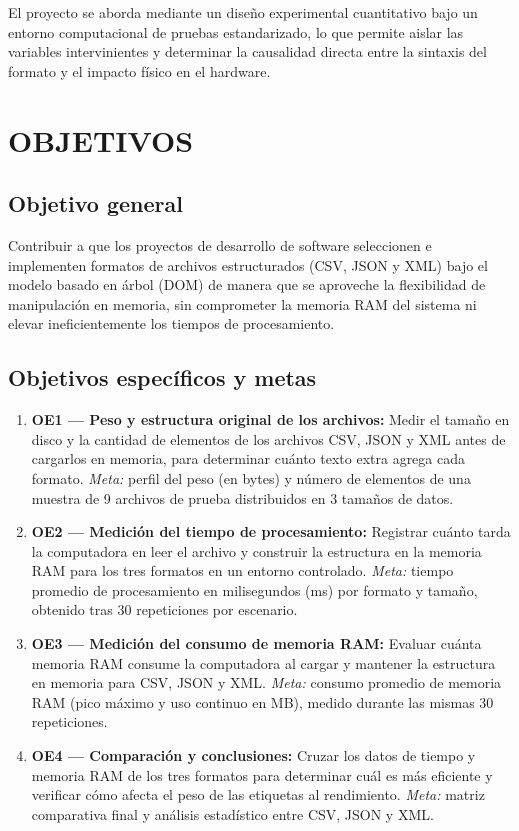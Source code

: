 El proyecto se aborda mediante un diseño experimental cuantitativo bajo un entorno computacional de pruebas estandarizado, lo que permite aislar las variables intervinientes y determinar la causalidad directa entre la sintaxis del formato y el impacto físico en el hardware.

\section{OBJETIVOS}

\subsection{Objetivo general}

Contribuir a que los proyectos de desarrollo de software seleccionen e implementen formatos de archivos estructurados (CSV, JSON y XML) bajo el modelo basado en árbol (DOM) de manera que se aproveche la flexibilidad de manipulación en memoria, sin comprometer la memoria RAM del sistema ni elevar ineficientemente los tiempos de procesamiento.

\subsection{Objetivos específicos y metas}

\nopagebreak
\begin{enumerate}
    \item[a)] \textbf{OE1 — Peso y estructura original de los archivos:} Medir el tamaño en disco y la cantidad de elementos de los archivos CSV, JSON y XML antes de cargarlos en memoria, para determinar cuánto texto extra agrega cada formato. \textit{Meta:} perfil del peso (en bytes) y número de elementos de una muestra de 9 archivos de prueba distribuidos en 3 tamaños de datos.
    
    \item[b)] \textbf{OE2 — Medición del tiempo de procesamiento:} Registrar cuánto tarda la computadora en leer el archivo y construir la estructura en la memoria RAM para los tres formatos en un entorno controlado. \textit{Meta:} tiempo promedio de procesamiento en milisegundos (ms) por formato y tamaño, obtenido tras 30 repeticiones por escenario.
    
    \item[c)] \textbf{OE3 — Medición del consumo de memoria RAM:} Evaluar cuánta memoria RAM consume la computadora al cargar y mantener la estructura en memoria para CSV, JSON y XML. \textit{Meta:} consumo promedio de memoria RAM (pico máximo y uso continuo en MB), medido durante las mismas 30 repeticiones.
    
    \item[d)] \textbf{OE4 — Comparación y conclusiones:} Cruzar los datos de tiempo y memoria RAM de los tres formatos para determinar cuál es más eficiente y verificar cómo afecta el peso de las etiquetas al rendimiento. \textit{Meta:} matriz comparativa final y análisis estadístico entre CSV, JSON y XML.
\end{enumerate}